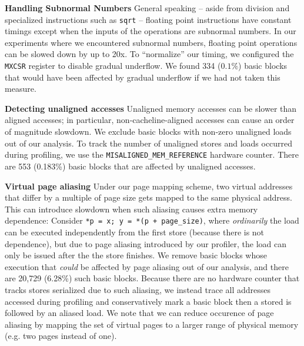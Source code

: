 \textbf{Handling Subnormal Numbers}
General speaking -- aside from division
and specialized instructions such as \verb|sqrt|
-- floating point instructions have constant timings
except when the inputs of the operations are subnormal numbers.
In our experiments where we encountered subnormal numbers,
floating point operations can be slowed down by up to 20x.
To ``normalize'' our timing, we configured the \verb|MXCSR| register
to disable gradual underflow.
We found 334 ($0.1\%$) basic blocks that would have been affected by 
gradual underflow if we had not taken this measure.

\textbf{Detecting unaligned accesses}
Unaligned memory accesses can be slower than aligned accesses; in particular,
non-cacheline-aligned accesses can cause
an order of magnitude slowdown.
We exclude basic blocks with non-zero unaligned loads out of our analysis.
To track the number of unaligned stores and loads occurred during profiling,
we use the 
\verb|MISALIGNED_MEM_REFERENCE| hardware counter.
There are 553 (0.183\%) basic blocks that are affected by unaligned accesses.

\textbf{Virtual page aliasing}
Under our page mapping scheme,
two virtual addresses that differ by a multiple of page size gets mapped to
the same physical address. This can introduce slowdown when such aliasing causes
extra memory dependence: Consider \verb|*p = x; y = *(p + page_size)|, where
\textit{ordinarily} the load can be executed independently from the first store 
(because there is not dependence),
but due to page aliasing introduced by our profiler, the load can only be issued
after the the store finishes.
We remove basic blocks whose execution that \textit{could} be affected by
page aliasing out of our analysis,
and there are 20,729 (6.28\%) such basic blocks.
Because there are no hardware counter that tracks stores serialized due
to such aliasing, we instead trace all addresses accessed during profiling and
conservatively mark a basic block then a stored is followed by an aliased load.
We note that we can reduce occurence of page aliasing by mapping the set of virtual
pages to a larger range of physical memory (e.g. two pages instead of one).

